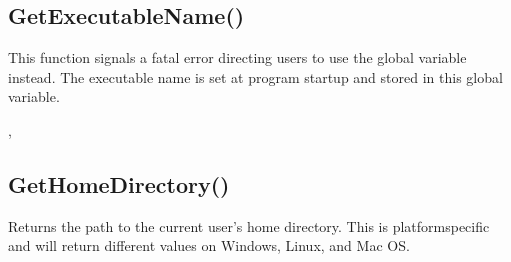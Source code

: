 \documentclass[letterpaper,10pt,english]{sphinxmanual}
\begin{document}
\ignorespaces 

\subsection{GetExecutableName()}
\label{\detokenize{reference/peblenvironment:getexecutablename}}\label{\detokenize{reference/peblenvironment:index-10}}
\sphinxAtStartPar
{}

\sphinxAtStartPar
{}

\sphinxAtStartPar
This function signals a fatal error directing users to use the global variable  instead. The executable name is set at program startup and stored in this global variable.

\sphinxAtStartPar
{}

\begin{sphinxVerbatim}[commandchars=\\\{\}]
\end{sphinxVerbatim}

\sphinxAtStartPar
{}

\sphinxAtStartPar
{}, 

\ignorespaces 

\subsection{GetHomeDirectory()}
\label{\detokenize{reference/peblenvironment:gethomedirectory}}\label{\detokenize{reference/peblenvironment:index-11}}
\sphinxAtStartPar
{}

\sphinxAtStartPar
{}

\sphinxAtStartPar
Returns the path to the current user’s home directory. This is platform\sphinxhyphen{}specific and will return different values on Windows, Linux, and Mac OS.

\sphinxAtStartPar
{}

\begin{sphinxVerbatim}[commandchars=\\\{\}]
\end{sphinxVerbatim}
\end{document}
